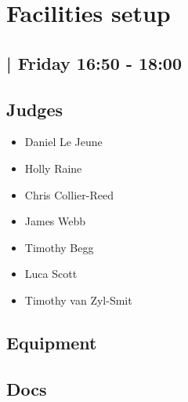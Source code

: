\documentclass[10pt]{article}
\begin{document}
		\begin{minipage}{\linewidth}
		\setcounter{section}{2}
	\section{Facilities setup  }
	\subsection*{ | Friday 16:50 - 18:00}

	

	\begin{multicols}{2}
	\subsection*{\faUsers \: Judges}
	\begin{itemize}
			\item Daniel Le Jeune
			\item Holly Raine
			\item Chris Collier-Reed
			\item James Webb
			\item Timothy Begg
			\item Luca Scott
			\item Timothy van Zyl-Smit
		\end{itemize}
	\columnbreak
	\subsection*{\faWrench \: Equipment}
	        \vfill\null
        \subsection*{\faFile \: Docs}
     	\end{multicols}


	\vspace{1cm}
	\end{minipage}
\end{document}
